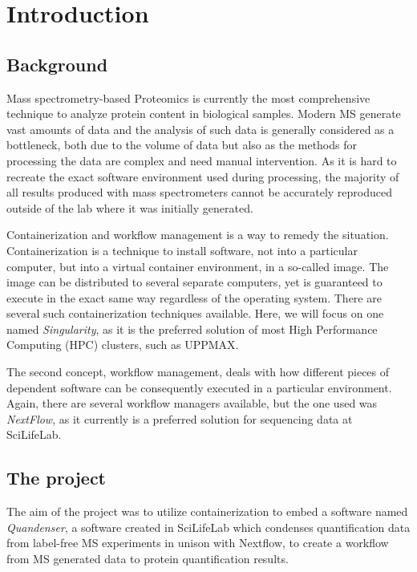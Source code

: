 \section{Introduction}

\subsection{Background}

Mass spectrometry-based Proteomics is currently the most comprehensive technique to analyze protein content in biological samples. Modern MS generate vast amounts of data and the analysis of such data is generally considered as a bottleneck, both due to the volume of data but also as the methods for processing the data are complex and need manual intervention. As it is hard to recreate the exact software environment used during processing, the majority of all results produced with mass spectrometers cannot be accurately reproduced outside of the lab where it was initially generated.

Containerization and workflow management is a way to remedy the situation. Containerization is a technique to install software, not into a particular computer, but into a virtual container environment, in a so-called image. The image can be distributed to several separate computers, yet is guaranteed to execute in the exact same way regardless of the operating system. There are several such containerization techniques available. Here, we will focus on one named \textit{Singularity}, as it is the preferred solution of most High Performance Computing (HPC) clusters, such as UPPMAX.

The second concept, workflow management, deals with how different pieces of dependent software can be consequently executed in a particular environment. Again, there are several workflow managers available, but the one used was \textit{NextFlow}, as it currently is a preferred solution for sequencing data at SciLifeLab.

\subsection{The project}

The aim of the project was to utilize containerization to embed a software named \textit{Quandenser}, a software created in SciLifeLab which condenses quantification data from label-free MS experiments \cite{quandenser} in unison with Nextflow, to create a workflow from MS generated data to protein quantification results.
